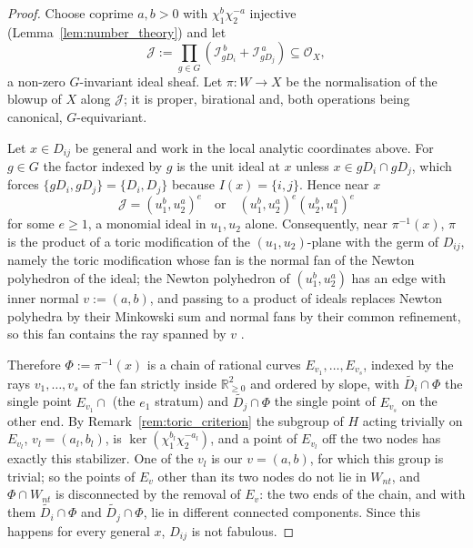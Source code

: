 \documentclass[11pt]{amsart}
\theoremstyle{plain}
\theoremstyle{definition}
\theoremstyle{remark}
\numberwithin{equation}{section}
\begin{document}
\begin{proof}
Choose coprime $a, b > 0$ with $\chi_1^b \chi_2^{-a}$ injective
(Lemma~\ref{lem:number_theory}) and let
\[
\mathcal{J} := \prod_{g \in G}
\left( \mathcal{I}_{g D_i}^{\,b} + \mathcal{I}_{g D_j}^{\,a} \right)
\subseteq \mathcal{O}_X ,
\]
a non-zero $G$-invariant ideal sheaf.  Let $\pi : W \to X$ be the
normalisation of the blowup of $X$ along $\mathcal{J}$; it is proper,
birational and, both operations being canonical, $G$-equivariant.

Let $x \in D_{ij}$ be general and work in the local analytic coordinates
above.  For $g \in G$ the factor indexed by $g$ is the unit ideal at $x$
unless $x \in gD_i \cap gD_j$, which forces $\{gD_i, gD_j\} = \{D_i,D_j\}$
because $I(x) = \{i,j\}$.  Hence near $x$
\[
\mathcal{J} = \left( u_1^b, u_2^a \right)^{e}
\quad \text{or} \quad
\left( u_1^b, u_2^a \right)^{e}\left( u_2^b, u_1^a \right)^{e}
\]
for some $e \geq 1$, a monomial ideal in $u_1, u_2$ alone.  Consequently,
near $\pi^{-1}(x)$, $\pi$ is the product of a toric modification of the
$(u_1,u_2)$-plane with the germ of $D_{ij}$, namely the toric modification
whose fan is the normal fan of the Newton polyhedron of the ideal; the
Newton polyhedron of $(u_1^b, u_2^a)$ has an edge with inner normal
$v := (a,b)$, and passing to a product of ideals replaces Newton
polyhedra by their Minkowski sum and normal fans by their common
refinement, so this fan contains the ray spanned by $v$
\cite{Fulton}.

Therefore $\Phi := \pi^{-1}(x)$ is a chain of rational curves
$E_{v_1}, \ldots, E_{v_s}$, indexed by the rays $v_1, \ldots, v_s$ of the
fan strictly inside $\mathbb{R}^2_{\geq 0}$ and ordered by slope, with
$\widetilde{D_i} \cap \Phi$ the single point $E_{v_1} \cap$ (the $e_1$
stratum) and $\widetilde{D_j} \cap \Phi$ the single point of $E_{v_s}$ on
the other end.  By Remark~\ref{rem:toric_criterion} the subgroup of $H$
acting trivially on $E_{v_l}$, $v_l = (a_l, b_l)$, is
$\ker(\chi_1^{b_l}\chi_2^{-a_l})$, and a point of $E_{v_l}$ off the two
nodes has exactly this stabilizer.  One of the $v_l$ is our $v = (a,b)$, for
which this group is trivial; so the points of $E_{v}$ other than its two
nodes do not lie in $W_{nt}$, and $\Phi \cap W_{nt}$ is disconnected by the
removal of $E_v$: the two ends of the chain, and with them
$\widetilde{D_i} \cap \Phi$ and $\widetilde{D_j} \cap \Phi$, lie in
different connected components.  Since this happens for every general $x$,
$D_{ij}$ is not fabulous.
\end{proof}
\end{document}
